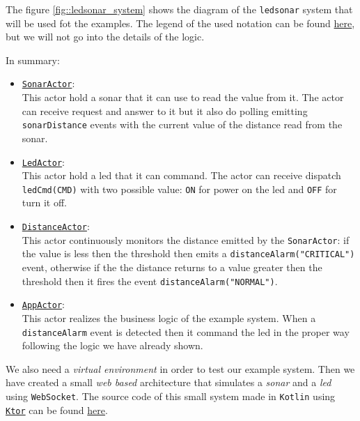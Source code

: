 The figure \ref{fig::ledsonar_system} shows the diagram of the \texttt{ledsonar} system that will be used fot the examples. The legend of the used notation can be found \href{https://github.com/anatali/issLab2021/blob/main/it.unibo.issLabStart/userDocs/Legenda.pptx}{here}, 
but we will not go into the details of the logic.

In summary:
\begin{itemize}
	\item \underline{\texttt{SonarActor}}:\\
	This actor hold a sonar that it can use to read the value from it.
	The actor can receive request and answer to it but it also do polling emitting \texttt{sonarDistance} events with the current value of the distance read from the sonar.
	
	\item \underline{\texttt{LedActor}}:\\
	This actor hold a led that it can command.
	The actor can receive dispatch \texttt{ledCmd(CMD)} with two possible value: \texttt{ON} for power on the led and \texttt{OFF} for turn it off.
	
	\item \underline{\texttt{DistanceActor}}:\\
	This actor continuously monitors the distance emitted by the \texttt{SonarActor}: if the value is less then the threshold then emits a \texttt{distanceAlarm("CRITICAL")} event, otherwise if the the distance returns to a value greater then the threshold then it fires the event \texttt{distanceAlarm("NORMAL")}.
	
	\item \underline{\texttt{AppActor}}:\\
	This actor realizes the business logic of the example system. When a \texttt{distanceAlarm} event is detected then it command the led in the proper way following the logic we have already shown.
\end{itemize}

We also need a \textit{virtual environment} in order to test our example system. Then we have created a small \textit{web based} architecture that simulates a \textit{sonar} and a \textit{led} using \texttt{WebSocket}.
The source code of this small system made in \texttt{Kotlin} using \href{https://ktor.io/}{\texttt{Ktor}} can be found \href{https://github.com/LM-96/QA-Extensions/tree/main/it.unibo.ledsonarsystem}{here}.

